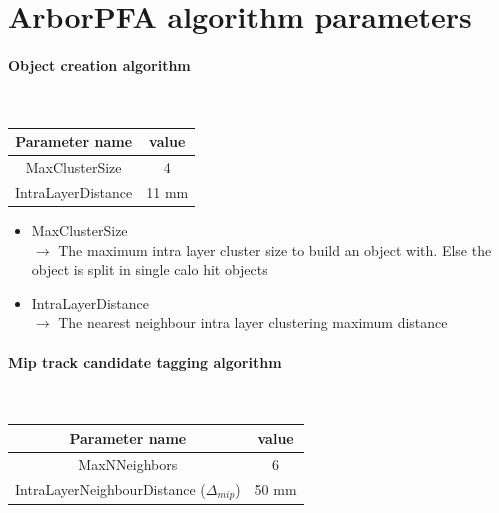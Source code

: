 \documentclass[cits]{JINST}
\begin{document}
\section{ArborPFA algorithm parameters}
\label{ARBOR_ALGORITHM_PARAMETERS}

\paragraph{Object creation algorithm} ~

\begin{table}[!h]
  \begin{center}
    \begin{tabu} to \linewidth { c | c } 
          Parameter name & value \\
          \hline
          MaxClusterSize & 4 \\
          IntraLayerDistance & 11 mm
    \end{tabu} 
  \end{center}
\end{table}

\begin{itemize}
 \item MaxClusterSize \\
 $\rightarrow$ The maximum intra layer cluster size to build an object with. Else the object is split in single calo hit objects
 \item IntraLayerDistance \\
 $\rightarrow$ The nearest neighbour intra layer clustering maximum distance
\end{itemize}


\paragraph{Mip track candidate tagging algorithm} ~

\begin{table}[!h]
  \begin{center}
    \begin{tabu} to \linewidth { c | c } 
          Parameter name & value \\
          \hline
          MaxNNeighbors & 6 \\
          IntraLayerNeighbourDistance ($\Delta_{mip}$) & 50 mm
    \end{tabu} 
  \end{center}
\end{table}
\end{document}
